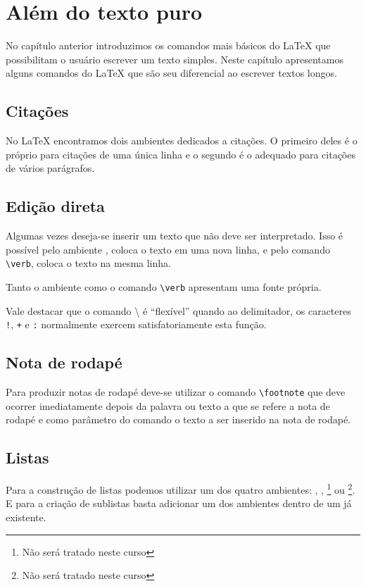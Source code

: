 \chapter{Além do texto puro}
No capítulo anterior introduzimos os comandos mais básicos do LaTeX que
possibilitam o usuário escrever um texto simples. Neste capítulo apresentamos
alguns comandos do LaTeX que são seu diferencial ao escrever textos longos.

\section{Citações}
No LaTeX encontramos dois ambientes dedicados a citações. O primeiro deles é o
 próprio para citações de
uma única linha e o segundo é o
 adequado para
citações de vários parágrafos.

\section{Edição direta}
Algumas vezes deseja-se inserir um texto que não deve ser interpretado. Isso é
possível pelo ambiente
, coloca o texto
em uma nova linha, e pelo comando
\lstinline!\verb!, coloca o texto na mesma
linha.

Tanto o ambiente  como o comando \lstinline!\verb! apresentam
uma fonte própria. \\

Vale destacar que o comando \textbackslash{} é ``flexível'' quando ao
delimitador, os caracteres \lstinline+!+, \lstinline!+! e \lstinline!:!
normalmente exercem satisfatoriamente esta função.

\section{Nota de rodapé}
Para produzir notas de rodapé deve-se
utilizar o comando
\lstinline!\footnote! que deve
ocorrer imediatamente depois da palavra ou texto a que se refere a nota de
rodapé e como parâmetro do comando o texto a ser inserido na nota de rodapé.

\section{Listas}
Para a construção de listas podemos utilizar um dos quatro
ambientes: , ,
\footnote{Não será tratado neste curso} ou
\footnote{Não será tratado neste curso}. E para a criação de
sublistas basta adicionar um dos ambientes dentro de um já existente.

